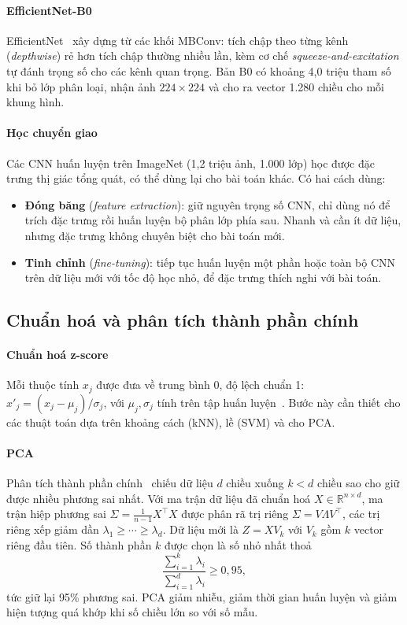 \paragraph*{EfficientNet-B0} EfficientNet~\cite{tan2019efficientnet} xây dựng từ các khối MBConv: tích chập theo từng kênh (\textit{depthwise}) rẻ hơn tích chập thường nhiều lần, kèm cơ chế \textit{squeeze-and-excitation} tự đánh trọng số cho các kênh quan trọng. Bản B0 có khoảng 4,0 triệu tham số khi bỏ lớp phân loại, nhận ảnh $224\times224$ và cho ra vector 1.280 chiều cho mỗi khung hình.

\paragraph*{Học chuyển giao} Các CNN huấn luyện trên ImageNet (1,2 triệu ảnh, 1.000 lớp) học được đặc trưng thị giác tổng quát, có thể dùng lại cho bài toán khác. Có hai cách dùng:
\begin{itemize}
  \item \textbf{Đóng băng} (\textit{feature extraction}): giữ nguyên trọng số CNN, chỉ dùng nó để trích đặc trưng rồi huấn luyện bộ phân lớp phía sau. Nhanh và cần ít dữ liệu, nhưng đặc trưng không chuyên biệt cho bài toán mới.
  \item \textbf{Tinh chỉnh} (\textit{fine-tuning}): tiếp tục huấn luyện một phần hoặc toàn bộ CNN trên dữ liệu mới với tốc độ học nhỏ, để đặc trưng thích nghi với bài toán.
\end{itemize}

\subsection{Chuẩn hoá và phân tích thành phần chính}
\label{subsec:pca}

\paragraph*{Chuẩn hoá z-score} Mỗi thuộc tính $x_j$ được đưa về trung bình 0, độ lệch chuẩn 1: $x'_j = (x_j - \mu_j)/\sigma_j$, với $\mu_j,\sigma_j$ tính trên tập huấn luyện~\cite{han2022}. Bước này cần thiết cho các thuật toán dựa trên khoảng cách (kNN), lề (SVM) và cho PCA.

\paragraph*{PCA} Phân tích thành phần chính~\cite{han2022} chiếu dữ liệu $d$ chiều xuống $k<d$ chiều sao cho giữ được nhiều phương sai nhất. Với ma trận dữ liệu đã chuẩn hoá $X\in\mathbb{R}^{n\times d}$, ma trận hiệp phương sai $\Sigma = \frac{1}{n-1}X^\top X$ được phân rã trị riêng $\Sigma = V\Lambda V^\top$, các trị riêng xếp giảm dần $\lambda_1\ge\cdots\ge\lambda_d$. Dữ liệu mới là $Z = XV_k$ với $V_k$ gồm $k$ vector riêng đầu tiên. Số thành phần $k$ được chọn là số nhỏ nhất thoả
\begin{equation}
  \frac{\sum_{i=1}^{k}\lambda_i}{\sum_{i=1}^{d}\lambda_i} \ge 0{,}95,
\end{equation}
tức giữ lại 95\% phương sai. PCA giảm nhiễu, giảm thời gian huấn luyện và giảm hiện tượng quá khớp khi số chiều lớn so với số mẫu.

